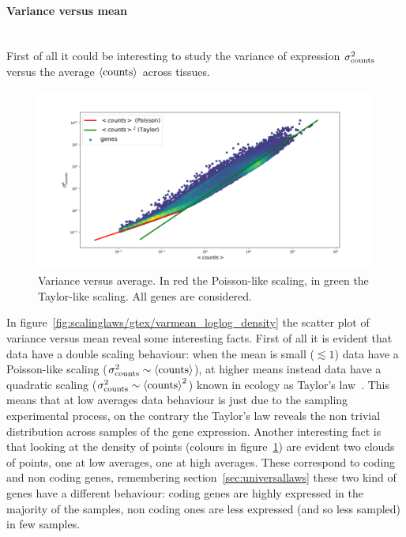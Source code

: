 \paragraph{Variance versus mean}\mbox{}\\
First of all it could be interesting to study the variance of expression $\sigma^2_{\mathrm{counts}}$ versus 
the average $\left\langle \mathrm{counts}\right\rangle$ across tissues.
\begin{figure}[htb!]
    \centering
    \includegraphics[width=0.9\linewidth]{pictures/scalinglaws/gtex/allgenes/varmean_loglog.png}
    \caption{Variance versus average. In \textcolor{pythonred}{red} the Poisson-like scaling, in \textcolor{pythongreen}{green} the Taylor-like scaling. All genes are considered.}
    \label{fig:scalinglaws/gtex/allgenes/varmean_loglog_density}
\end{figure}
In figure~\ref{fig:scalinglaws/gtex/varmean_loglog_density} the scatter plot of variance versus mean reveal some interesting facts.
First of all it is evident that data have a double scaling behaviour: when the mean is small ($\lesssim 1$) data have a Poisson-like scaling ($\sigma^2_{\mathrm{counts}} \sim \left\langle \mathrm{counts}\right\rangle$), at higher means instead data have a quadratic scaling ($\sigma^2_{\mathrm{counts}} \sim \left\langle \mathrm{counts}\right\rangle^2$) known in ecology as Taylor's law~\cite{Eisler2008}. This means that at low averages data behaviour is just due to the sampling experimental process, on the contrary the Taylor's law reveals the non trivial distribution across samples of the gene expression.
Another interesting fact is that looking at the density of points (colours in figure~\ref{fig:scalinglaws/gtex/allgenes/varmean_loglog_density}) are evident two clouds of points, one at low averages, one at high averages. These correspond to coding and non coding genes, remembering section~\ref{sec:universallaws} these two kind of genes have a different behaviour: coding genes are highly expressed in the majority of the samples, non coding ones are less expressed (and so less sampled) in few samples. 

